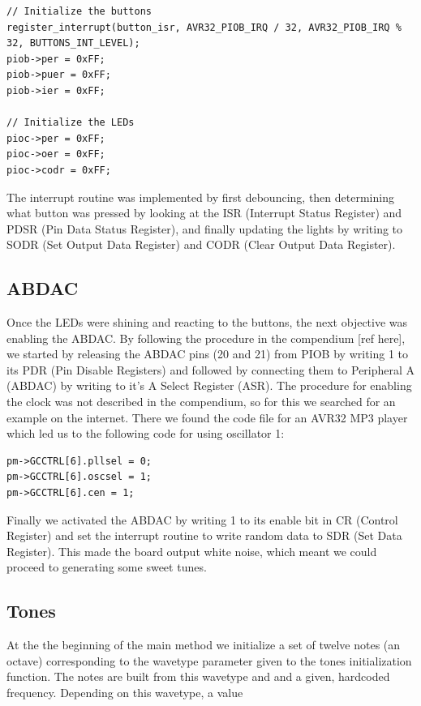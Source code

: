 \documentclass[a4paper,12pt]{article}
\begin{document}
\begin{verbatim}
// Initialize the buttons
register_interrupt(button_isr, AVR32_PIOB_IRQ / 32, AVR32_PIOB_IRQ % 32, BUTTONS_INT_LEVEL);
piob->per = 0xFF;
piob->puer = 0xFF;
piob->ier = 0xFF;

// Initialize the LEDs
pioc->per = 0xFF;
pioc->oer = 0xFF;
pioc->codr = 0xFF;
\end{verbatim}

The interrupt routine was implemented by first debouncing, then determining what button was pressed by looking at the ISR (Interrupt Status Register) and PDSR (Pin Data Status Register), and finally updating the lights by writing to SODR (Set Output Data Register) and CODR (Clear Output Data Register).

\subsection{ABDAC}
Once the LEDs were shining and reacting to the buttons, the next objective was enabling the ABDAC. By following the procedure in the compendium [ref here], we started by releasing the
ABDAC pins (20 and 21) from PIOB by writing 1 to its PDR (Pin Disable Registers) and followed by connecting them to Peripheral A (ABDAC) by writing to it’s A Select Register (ASR). The procedure for enabling the clock was not described in the compendium, so for this we searched for an example on the internet. There we found the code file for an AVR32 MP3 player \cite{clockex} which led us to the following code for using oscillator 1:

\begin{verbatim}
pm->GCCTRL[6].pllsel = 0;
pm->GCCTRL[6].oscsel = 1;
pm->GCCTRL[6].cen = 1;
\end{verbatim}

Finally we activated the ABDAC by writing 1 to its enable bit in CR (Control Register) and set the interrupt routine to write random data to SDR (Set Data Register). This made the board output white noise, which meant we could proceed to generating some sweet tunes.

\subsection{Tones}
At the the beginning of the main method we initialize a set of twelve notes (an octave) corresponding to the wavetype parameter given to the tones initialization function. The notes are built from this wavetype and and a given, hardcoded frequency. Depending on this wavetype, a value 
\end{document}
